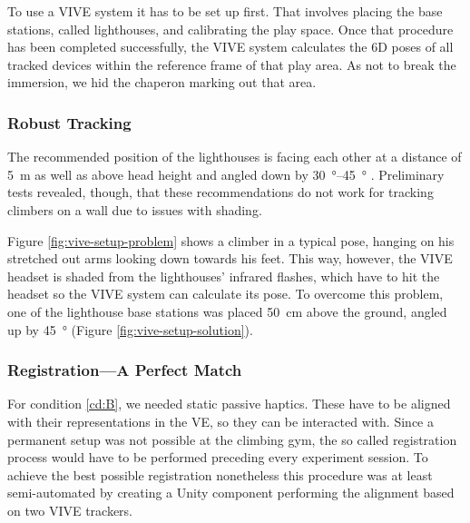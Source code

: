 To use a VIVE system it has to be set up first. That involves placing the base stations, called lighthouses, and calibrating the play space. Once that procedure has been completed successfully, the VIVE system calculates the 6D poses of all tracked devices within the reference frame of that play area. As not to break the immersion, we hid the chaperon marking out that area.

\subsubsection*{Robust Tracking}

The recommended position of the lighthouses is facing each other at a distance of \SI{5}{\meter} as well as above head height and angled down by \SIrange{30}{45}{\degree} \autocite{HTCVIVEDeveloper2018}. Preliminary tests revealed, though, that these recommendations do not work for tracking climbers on a wall due to issues with shading.



Figure \ref{fig:vive-setup-problem} shows a climber in a typical pose, hanging on his stretched out arms looking down towards his feet. This way, however, the VIVE headset is shaded from the lighthouses' infrared flashes, which have to hit the headset so the VIVE system can calculate its pose. To overcome this problem, one of the lighthouse base stations was placed \SI{50}{\cm} above the ground, angled up by \SI{45}{\degree} (Figure \ref{fig:vive-setup-solution}).

\subsubsection*{Registration---A Perfect Match}

For condition \ref{cd:B}, we needed static passive haptics. These have to be aligned with their representations in the \gls{VE}, so they can be interacted with. Since a permanent setup was not possible at the climbing gym, the so called registration process would have to be performed preceding every experiment session. To achieve the best possible registration nonetheless this procedure was at least semi-automated by creating a Unity component performing the alignment based on two VIVE trackers.


